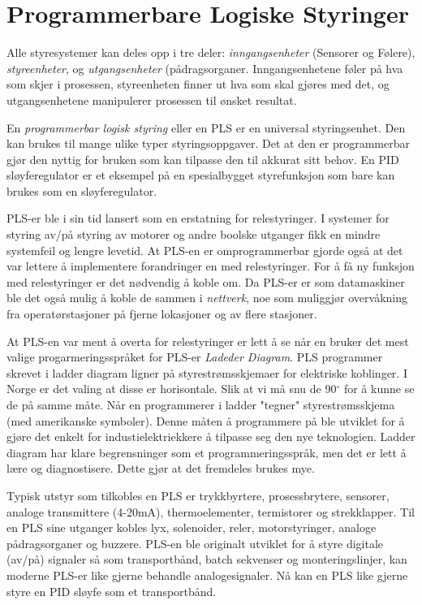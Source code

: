 
\chapter{Programmerbare Logiske Styringer}

Alle styresystemer kan deles opp i tre deler: \textit{inngangsenheter} (Sensorer og Følere), \textit{styreenheter}, og \textit{utgangsenheter} (pådragsorganer. Inngangsenhetene føler på hva som skjer i prosessen, styreenheten finner ut hva som skal gjøres med det, og utgangsenhetene manipulerer prosessen til ønsket resultat. 

En \textit{programmerbar logisk styring} eller en PLS er en universal styringsenhet. Den kan brukes til mange ulike typer styringsoppgaver. Det at den er programmerbar gjør den nyttig for bruken som kan  tilpasse den til akkurat sitt behov. En PID sløyferegulator er et eksempel på en spesialbygget styrefunksjon som bare kan brukes som en sløyferegulator. 
 

PLS-er ble i sin tid lansert som en erstatning for relestyringer. I systemer for styring av/på styring av motorer og andre boolske utganger fikk en mindre systemfeil og lengre levetid. At PLS-en er omprogrammerbar gjorde også at det var lettere å implementere forandringer en med relestyringer. For å få ny funksjon med relestyringer  er det nødvendig å koble om. Da PLS-er er som datamaskiner ble det også mulig å koble de sammen i \textit{nettverk}, noe som muliggjør overvåkning fra operatørstasjoner på fjerne lokasjoner og av flere stasjoner. 

At PLS-en var ment å overta for relestyringer er lett å se når en bruker det mest valige progarmeringsspråket for PLS-er \textit{Ladeder Diagram}. PLS programmer skrevet i ladder diagram ligner på styrestrømsskjemaer for elektriske koblinger. I Norge er det valing at disse er horisontale. Slik at vi må snu de 90$^{\circ}$ for å kunne se de på samme måte. Når en programmerer i ladder "tegner" styrestrømsskjema (med amerikanske symboler). Denne måten å programmere på ble utviklet for å gjøre det enkelt for industielektriekkere å tilpasse seg den nye teknologien. Ladder diagram har klare begrensninger som et programmeringsspråk, men det er lett å lære og diagnostisere. Dette gjør at det fremdeles brukes mye.   

Typisk utstyr som tilkobles en PLS er trykkbyrtere, prosessbrytere, sensorer, analoge transmittere (4-20mA), thermoelementer, termistorer og strekklapper. Til en PLS sine utganger kobles lyx, solenoider, reler, motorstyringer, analoge pådragsorganer og buzzere. PLS-en ble originalt utviklet for å styre digitale (av/på) signaler så som transportbånd, batch sekvenser og monteringslinjer, kan moderne PLS-er like gjerne behandle analogesignaler. Nå kan en PLS like gjerne styre en PID sløyfe som et transportbånd. 




